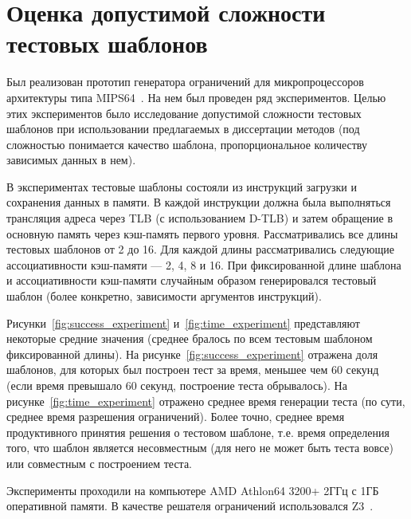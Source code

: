 \documentclass[14pt]{extreport}
\begin{document}
\section{Оценка допустимой сложности тестовых шаблонов}


Был реализован прототип генератора ограничений для микропроцессоров архитектуры
типа MIPS64~\cite{mips64_II}. На нем был проведен ряд экспериментов. Целью этих
экспериментов было исследование допустимой сложности тестовых шаблонов при
использовании предлагаемых в диссертации методов (под сложностью понимается
качество шаблона, пропорциональное количеству зависимых данных в нем).

В экспериментах тестовые шаблоны состояли из инструкций загрузки и сохранения
данных в памяти. В каждой инструкции должна была выполняться трансляция адреса
через TLB (с использованием D-TLB) и затем обращение в основную память через
кэш-память первого уровня. Рассматривались все длины тестовых шаблонов от 2 до
16. Для каждой длины рассматривались следующие ассоциативности кэш-памяти --- 2,
4, 8 и 16. При фиксированной длине шаблона и ассоциативности кэш-памяти
случайным образом генерировался тестовый шаблон (более конкретно, зависимости
аргументов инструкций).

Рисунки~\ref{fig:success_experiment} и~\ref{fig:time_experiment} представляют
некоторые средние значения (среднее бралось по всем тестовым шаблоном
фиксированной длины). На рисунке~\ref{fig:success_experiment} отражена доля
шаблонов, для которых был построен тест за время, меньшее чем 60 секунд (если
время превышало 60 секунд, построение теста обрывалось). На
рисунке~\ref{fig:time_experiment} отражено среднее время генерации теста (по
сути, среднее время разрешения ограничений). Более точно, среднее время
продуктивного принятия решения о тестовом шаблоне, т.е. время определения того,
что шаблон является несовместным (для него не может быть теста вовсе) или
совместным с построением теста.

Эксперименты проходили на компьютере AMD Athlon64 3200+ 2ГГц с 1ГБ оперативной
памяти. В качестве решателя ограничений использовался Z3~\cite{Z3}.
\end{document}
